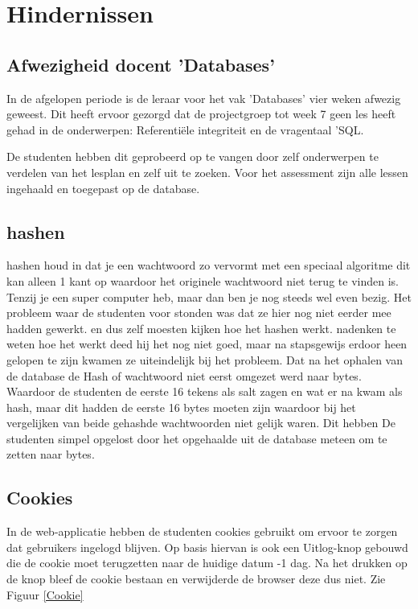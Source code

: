 \documentclass[11pt]{article}
\begin{document}
	\section{Hindernissen}
	
	\subsection{Afwezigheid docent 'Databases'}
	In de afgelopen periode is de leraar voor het vak 'Databases' vier weken afwezig geweest. Dit heeft ervoor gezorgd dat de projectgroep tot week 7 geen les heeft gehad in de onderwerpen: Referentiële integriteit en de vragentaal 'SQL.
	
	De studenten hebben dit geprobeerd op te vangen door zelf onderwerpen te verdelen van het lesplan en zelf uit te zoeken. Voor het assessment zijn alle lessen ingehaald en toegepast op de database. 
	
	\subsection{hashen}
	hashen houd in dat je een wachtwoord zo vervormt met een speciaal algoritme dit kan alleen 1 kant op waardoor het originele wachtwoord niet terug te vinden is. Tenzij je een super computer heb, maar dan ben je nog steeds wel even bezig. Het probleem waar de studenten voor stonden was dat ze hier nog niet eerder mee hadden gewerkt. en dus zelf moesten kijken	hoe het hashen werkt. nadenken te weten hoe het werkt deed hij het nog niet goed, maar na stapsgewijs erdoor heen gelopen te zijn kwamen ze uiteindelijk bij het probleem. Dat na het ophalen van de database de Hash of wachtwoord niet eerst omgezet werd naar bytes. Waardoor de studenten de eerste 16 tekens als salt zagen en wat er na kwam als hash, maar dit hadden de eerste 16 bytes moeten zijn waardoor bij het vergelijken van beide gehashde wachtwoorden niet gelijk waren. Dit hebben De studenten simpel opgelost door het opgehaalde uit de database meteen om te zetten naar bytes.
	
	\subsection{Cookies}
	In de web-applicatie hebben de studenten cookies gebruikt om ervoor te zorgen dat gebruikers ingelogd blijven. Op basis hiervan is ook een Uitlog-knop gebouwd die de cookie moet terugzetten naar de huidige datum -1 dag. Na het drukken op de knop bleef de cookie bestaan en verwijderde de browser deze dus niet. Zie Figuur \ref{Cookie}
	
\end{document}
